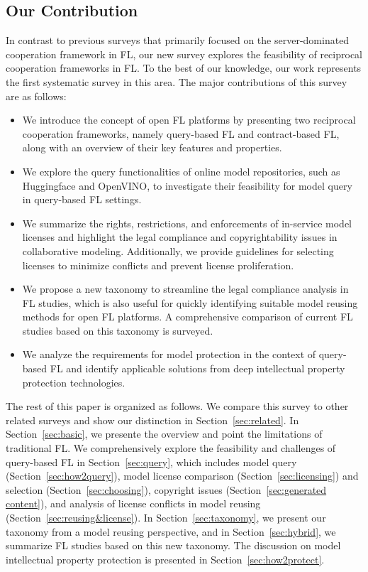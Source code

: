 \subsection{Our Contribution}
  In contrast to previous surveys that primarily focused on the server-dominated cooperation framework in FL,  our new survey explores the feasibility of reciprocal cooperation frameworks in FL.
  To the best of our knowledge, our work represents the first systematic survey in this area.
  The major contributions of this survey are as follows:
  \begin{itemize}
      \item We introduce the concept of open FL platforms by presenting two reciprocal cooperation frameworks, namely query-based FL and contract-based FL, along with an overview of their key features and properties.
      \item We explore the query functionalities of online model repositories, such as Huggingface and OpenVINO, to investigate their feasibility for model query in query-based FL settings.
      \item We summarize the rights, restrictions, and enforcements of in-service model licenses and highlight the legal compliance and copyrightability issues in collaborative modeling. Additionally, we provide guidelines for selecting licenses to minimize conflicts and prevent license proliferation.
      \item We propose a new taxonomy to streamline the legal compliance analysis in FL studies, which is also useful for quickly identifying suitable model reusing methods for open FL platforms. A comprehensive comparison of current FL studies based on this taxonomy is surveyed.
      \item We analyze the requirements for model protection in the context of query-based FL and identify applicable solutions from deep intellectual property protection technologies.
\end{itemize}
  
The rest of this paper is organized as follows. 
We compare this survey to other related surveys and show our distinction in Section~\ref{sec:related}. 
In Section~\ref{sec:basic}, we presente the overview and point the limitations of traditional FL.
We comprehensively explore the feasibility and challenges of query-based FL in Section~\ref{sec:query}, which includes model query (Section~\ref{sec:how2query}), model license comparison (Section~\ref{sec:licensing}) and selection (Section~\ref{sec:choosing}), copyright issues (Section~\ref{sec:generated content}), and analysis of license conflicts in model reusing (Section~\ref{sec:reusing&license}).
In Section~\ref{sec:taxonomy}, we present our taxonomy from a model reusing perspective, and in Section~\ref{sec:hybrid}, we summarize FL studies based on this new taxonomy.
The discussion on model intellectual property protection is presented in Section~\ref{sec:how2protect}.


